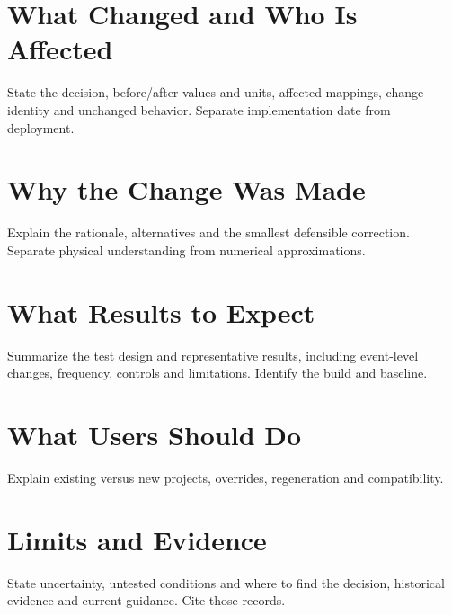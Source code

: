 \section{What Changed and Who Is Affected}
State the decision, before/after values and units, affected mappings, change
identity and unchanged behavior. Separate implementation date from deployment.

\section{Why the Change Was Made}
Explain the rationale, alternatives and the smallest defensible correction.
Separate physical understanding from numerical approximations.

\section{What Results to Expect}
Summarize the test design and representative results, including event-level
changes, frequency, controls and limitations. Identify the build and baseline.

\section{What Users Should Do}
Explain existing versus new projects, overrides, regeneration and compatibility.

\section{Limits and Evidence}
State uncertainty, untested conditions and where to find the decision,
historical evidence and current guidance. Cite those records.
